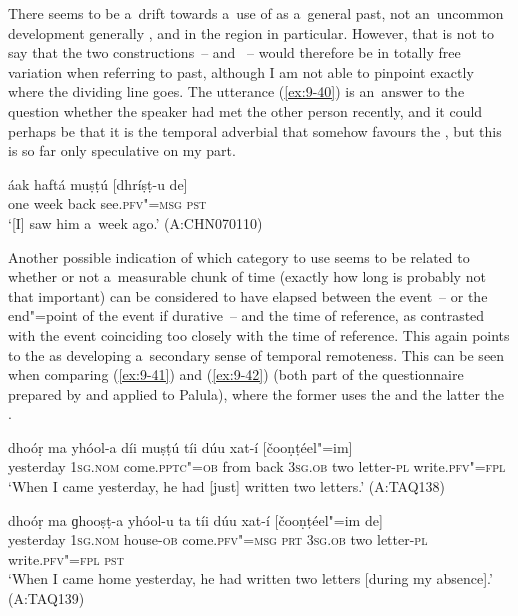 There seems to be a~drift towards a~use of  as a~general  past, not an~uncommon development generally \citep[147]{dahl1985}, and in the region in particular. However, that is not to say that the two constructions~--  and ~-- would therefore be in totally free variation when referring to  past, although I am not able to pinpoint exactly where the dividing line goes. The utterance (\ref{ex:9-40}) is an~answer to the question whether the speaker had met the other person recently, and it could perhaps be that it is the temporal adverbial  that somehow favours the , but this is so far only speculative on my part.

\begin{exe}
\ex
\label{ex:9-40}
\gll áak haftá muṣṭú [dhríṣṭ-u de]  \\
one week back see.\textsc{pfv"=msg} \textsc{pst} \\
\glt `[I] saw him a~week ago.' (A:CHN070110)
\end{exe}

Another possible indication of which category to use seems to be related to whether or not a~measurable chunk of time (exactly how long is probably not that important) can be considered to have elapsed between the event~-- or the end"=point of the event if durative~-- and the time of reference, as contrasted with the event coinciding too closely with the time of reference. This again points to the  as developing a~secondary sense of temporal remoteness. This can be seen when comparing (\ref{ex:9-41}) and (\ref{ex:9-42}) (both part of the questionnaire prepared by \citet{dahl1985} and applied to Palula), where the former uses the  and the latter the .

\begin{exe}
\ex
\label{ex:9-41}
\gll \label{bkm:Ref190742986}dhoóṛ ma yhóol-a díi muṣṭú tíi dúu xat-í [čooṇṭéel"=im] \\
yesterday 1\textsc{sg.nom} come.\textsc{pptc"=ob} from back \textsc{3sg.ob} two letter-\textsc{pl} write.\textsc{pfv"=fpl} \\
\glt `When I came yesterday, he had [just] written two letters.' (A:TAQ138)

\ex
\label{ex:9-42}
\gll dhoóṛ ma ɡhooṣṭ-a yhóol-u ta tíi dúu xat-í [čooṇṭéel"=im de] \\
yesterday 1\textsc{sg.nom} house-\textsc{ob} come.\textsc{pfv"=msg}  \textsc{prt} \textsc{3sg.ob} two letter-\textsc{pl} write.\textsc{pfv"=fpl} \textsc{pst} \\
\glt `When I came home yesterday, he had written two letters [during my absence].' (A:TAQ139)
\end{exe}

